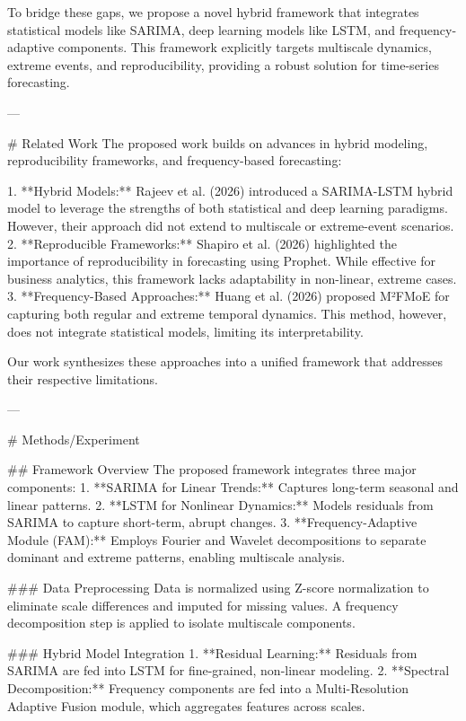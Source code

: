 To bridge these gaps, we propose a novel hybrid framework that integrates statistical models like SARIMA, deep learning models like LSTM, and frequency-adaptive components. This framework explicitly targets multiscale dynamics, extreme events, and reproducibility, providing a robust solution for time-series forecasting.  

---

# Related Work  
The proposed work builds on advances in hybrid modeling, reproducibility frameworks, and frequency-based forecasting:  

1. **Hybrid Models:** Rajeev et al. (2026) introduced a SARIMA-LSTM hybrid model to leverage the strengths of both statistical and deep learning paradigms. However, their approach did not extend to multiscale or extreme-event scenarios.  
2. **Reproducible Frameworks:** Shapiro et al. (2026) highlighted the importance of reproducibility in forecasting using Prophet. While effective for business analytics, this framework lacks adaptability in non-linear, extreme cases.  
3. **Frequency-Based Approaches:** Huang et al. (2026) proposed M²FMoE for capturing both regular and extreme temporal dynamics. This method, however, does not integrate statistical models, limiting its interpretability.  

Our work synthesizes these approaches into a unified framework that addresses their respective limitations.  

---

# Methods/Experiment  

## Framework Overview  
The proposed framework integrates three major components:  
1. **SARIMA for Linear Trends:** Captures long-term seasonal and linear patterns.  
2. **LSTM for Nonlinear Dynamics:** Models residuals from SARIMA to capture short-term, abrupt changes.  
3. **Frequency-Adaptive Module (FAM):** Employs Fourier and Wavelet decompositions to separate dominant and extreme patterns, enabling multiscale analysis.  

### Data Preprocessing  
Data is normalized using Z-score normalization to eliminate scale differences and imputed for missing values. A frequency decomposition step is applied to isolate multiscale components.  

### Hybrid Model Integration  
1. **Residual Learning:** Residuals from SARIMA are fed into LSTM for fine-grained, non-linear modeling.  
2. **Spectral Decomposition:** Frequency components are fed into a Multi-Resolution Adaptive Fusion module, which aggregates features across scales.  

